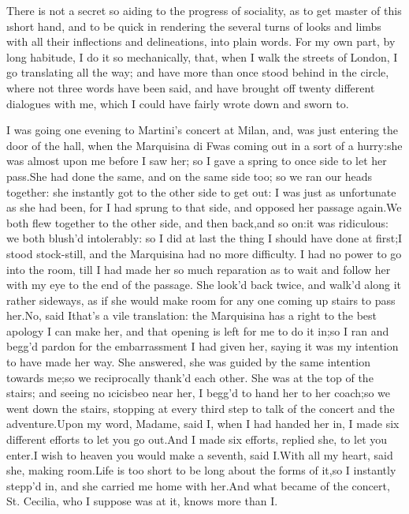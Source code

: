 \documentclass[twoside]{article}
\begin{document}
There is not a secret so aiding to the progress of sociality, as to get
master of this \i{short hand}, and to be quick in rendering the several
turns of looks and limbs with all their inflections and delineations,
into plain words.  For my own part, by long habitude, I do it so
mechanically, that, when I walk the streets of London, I go translating
all the way; and have more than once stood behind in the circle, where
not three words have been said, and have brought off twenty different
dialogues with me, which I could have fairly wrote down and sworn to.

I was going one evening to Martini’s concert at Milan, and, was just
entering the door of the hall, when the Marquisina di F\tsk  was coming out
in a sort of a hurry:\tsk she was almost upon me before I saw her; so I gave
a spring to once side to let her pass.\tsk She had done the same, and on the
same side too; so we ran our heads together: she instantly got to the
other side to get out: I was just as unfortunate as she had been, for I
had sprung to that side, and opposed her passage again.\tsk We both flew
together to the other side, and then back,\tsk and so on:\tsk it was ridiculous:
we both blush’d intolerably: so I did at last the thing I should have
done at first;\tsk I stood stock-still, and the Marquisina had no more
difficulty.  I had no power to go into the room, till I had made her so
much reparation as to wait and follow her with my eye to the end of the
passage.  She look’d back twice, and walk’d along it rather sideways, as
if she would make room for any one coming up stairs to pass her.\tsk No, said
I\tsk that’s a vile translation: the Marquisina has a right to the best
apology I can make her, and that opening is left for me to do it in;\tsk so I
ran and begg’d pardon for the embarrassment I had given her, saying it
was my intention to have made her way.  She answered, she was guided by
the same intention towards me;\tsk so we reciprocally thank’d each other.
She was at the top of the stairs; and seeing no \i{cicisbeo} near her, I
begg’d to hand her to her coach;\tsk so we went down the stairs, stopping at
every third step to talk of the concert and the adventure.\tsk Upon my word,
Madame, said I, when I had handed her in, I made six different efforts to
let you go out.\tsk And I made six efforts, replied she, to let you enter.\tsk I
wish to heaven you would make a seventh, said I.\tsk With all my heart, said
she, making room.\tsk Life is too short to be long about the forms of it,\tsk so
I instantly stepp’d in, and she carried me home with her.\tsk And what became
of the concert, St. Cecilia, who I suppose was at it, knows more than I.
\end{document}
